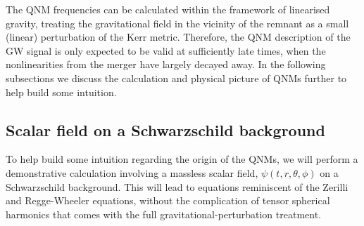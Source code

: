 The QNM frequencies can be calculated within the framework of linearised gravity, treating the gravitational field in the vicinity of the remnant as a small (linear) perturbation of the Kerr metric.
Therefore, the QNM description of the GW signal is only expected to be valid at sufficiently late times, when the nonlinearities from the merger have largely decayed away. 
In the following subsections we discuss the calculation and physical picture of QNMs further to help build some intuition.


\subsection{Scalar field on a Schwarzschild background}
\label{ch1:sec:scalar}

To help build some intuition regarding the origin of the QNMs, we will perform a demonstrative calculation involving a massless scalar field, $\psi(t,r,\theta,\phi)$ on a Schwarzschild background.
This will lead to equations reminiscent of the Zerilli and Regge-Wheeler equations, without the complication of tensor spherical harmonics that comes with the full gravitational-perturbation treatment.

